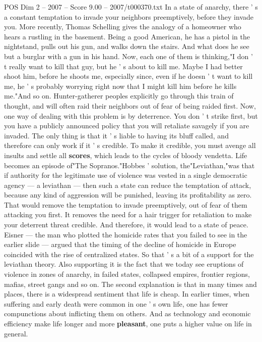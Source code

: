 \begin{textsample}{POS Dim 2 – 2007 – Score 9.00 – 2007/t000370.txt}
In a state of anarchy, there ' s a constant temptation to invade your neighbors preemptively, before they invade you.
More recently, Thomas Schelling gives the analogy of a homeowner who hears a rustling in the basement.
Being a good American, he has a pistol in the nightstand, pulls out his gun, and walks down the stairs.
And what does he see but a burglar with a gun in his hand.
Now, each one of them is thinking,"I don ' t really want to kill that guy, but he ' s about to kill me.
Maybe I had better shoot him, before he shoots me, especially since, even if he doesn ' t want to kill me, he ' s probably worrying right now that I might kill him before he kills me."And so on.
Hunter-gatherer peoples explicitly go through this train of thought, and will often raid their neighbors out of fear of being raided first.
Now, one way of dealing with this problem is by deterrence.
You don ' t strike first, but you have a publicly announced policy that you will retaliate savagely if you are invaded.
The only thing is that it ' s liable to having its bluff called, and therefore can only work if it ' s credible.
To make it credible, you must avenge all insults and settle all \textbf{scores}, which leads to the cycles of bloody vendetta.
Life becomes an episode of"The Sopranos."Hobbes ' solution, the"Leviathan,"was that if authority for the legitimate use of violence was vested in a single democratic agency — a leviathan — then such a state can reduce the temptation of attack, because any kind of aggression will be punished, leaving its profitability as zero.
That would remove the temptation to invade preemptively, out of fear of them attacking you first.
It removes the need for a hair trigger for retaliation to make your deterrent threat credible.
And therefore, it would lead to a state of peace.
Eisner — the man who plotted the homicide rates that you failed to see in the earlier slide — argued that the timing of the decline of homicide in Europe coincided with the rise of centralized states.
So that ' s a bit of a support for the leviathan theory.
Also supporting it is the fact that we today see eruptions of violence in zones of anarchy, in failed states, collapsed empires, frontier regions, mafias, street gangs and so on.
The second explanation is that in many times and places, there is a widespread sentiment that life is cheap.
In earlier times, when suffering and early death were common in one ' s own life, one has fewer compunctions about inflicting them on others.
And as technology and economic efficiency make life longer and more \textbf{pleasant}, one puts a higher value on life in general.

\end{textsample}
